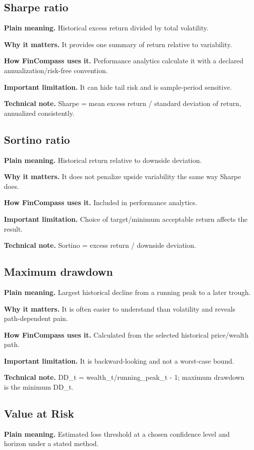 \documentclass[11pt]{article}
\begin{document}
\subsection{Sharpe ratio}
\textbf{Plain meaning.} Historical excess return divided by total volatility.

\textbf{Why it matters.} It provides one summary of return relative to variability.

\textbf{How FinCompass uses it.} Performance analytics calculate it with a declared annualization/risk-free convention.

\textbf{Important limitation.} It can hide tail risk and is sample-period sensitive.

\textbf{Technical note.} Sharpe = mean excess return / standard deviation of return, annualized consistently.

\subsection{Sortino ratio}
\textbf{Plain meaning.} Historical return relative to downside deviation.

\textbf{Why it matters.} It does not penalize upside variability the same way Sharpe does.

\textbf{How FinCompass uses it.} Included in performance analytics.

\textbf{Important limitation.} Choice of target/minimum acceptable return affects the result.

\textbf{Technical note.} Sortino = excess return / downside deviation.

\subsection{Maximum drawdown}
\textbf{Plain meaning.} Largest historical decline from a running peak to a later trough.

\textbf{Why it matters.} It is often easier to understand than volatility and reveals path-dependent pain.

\textbf{How FinCompass uses it.} Calculated from the selected historical price/wealth path.

\textbf{Important limitation.} It is backward-looking and not a worst-case bound.

\textbf{Technical note.} DD\_t = wealth\_t/running\_peak\_t - 1; maximum drawdown is the minimum DD\_t.

\subsection{Value at Risk}
\textbf{Plain meaning.} Estimated loss threshold at a chosen confidence level and horizon under a stated method.
\end{document}
